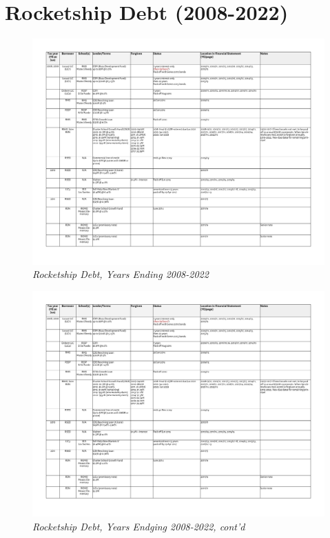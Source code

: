 
\chapter{Rocketship Debt (2008-2022)}\label{ch:debt_2010-22}

\begin{figure}
  \caption[Rocketship Debt, Years Ending 2008–2022]{\textit{Rocketship Debt, Years Ending 2008-2022}}%
  \label{fig:debt_2008-2022} %
  \includegraphics[page=1,width=\textheight]{Debt_2008-2022} %
\end{figure}

\begin{figure}
  \caption*{\textit{Rocketship Debt, Years Endging 2008-2022, cont'd}}
  \includegraphics[page=2,width=\textheight]{Debt_2008-2022} %
\end{figure}

